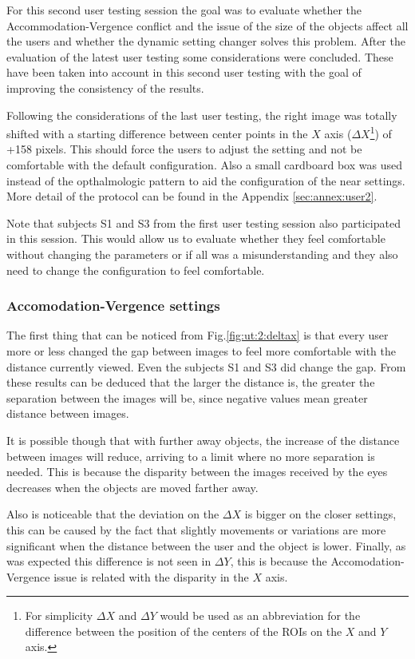 \documentclass[10pt,a4paper,twocolumn,twoside]{article}
\begin{document}
	For this second user testing session the goal was to evaluate whether the Accommodation-Vergence conflict and the issue of the size of the objects affect all the users and whether the dynamic setting changer solves this problem. After the evaluation of the latest user testing some considerations were concluded. These have been taken into account in this second user testing with the goal of improving the consistency of the results. 
	
	Following the considerations of the last user testing, the right image was totally shifted with a starting difference between center points in the $X$ axis ($\Delta X$\footnote{For simplicity  $\Delta X$ and $\Delta Y$ would be used as an abbreviation for the difference between the position of the centers of the ROIs on the $X$ and $Y$ axis. }) of +158 pixels. This should force the users to adjust the setting and not be comfortable with the default configuration. Also a small cardboard box was used instead of the opthalmologic pattern to aid the configuration of the near settings. More detail of the protocol can be found in the Appendix \ref{sec:annex:user2}.
	
	Note that subjects S1 and S3 from the first user testing session also participated in this session. This would allow us to evaluate whether they feel comfortable without changing the parameters or if all was a misunderstanding and they also need to change the configuration to feel comfortable. 
	
	\subsubsection{Accomodation-Vergence settings}
	The first thing that can be noticed from Fig.\ref{fig:ut:2:deltax} is that every user more or less changed the gap between images to feel more comfortable with the distance currently viewed. Even the subjects S1 and S3 did change the gap. From these results can be deduced that the larger the distance is, the greater the separation between the images will be, since negative values mean greater distance between images. 
	
	It is possible though that with further away objects, the increase of the distance between images will reduce, arriving to a limit where no more separation is needed. This is because the disparity between the images received by the eyes decreases when the objects are moved farther away.
	
	Also is noticeable that the deviation on the $\Delta X$ is bigger on the closer settings, this can be caused by the fact that slightly movements or variations are more significant when the distance between the user and the object is lower. 
	Finally, as was expected this difference is not seen in $\Delta Y$, this is because the Accomodation-Vergence issue is related with the disparity in the $X$ axis. 
	
\end{document}
